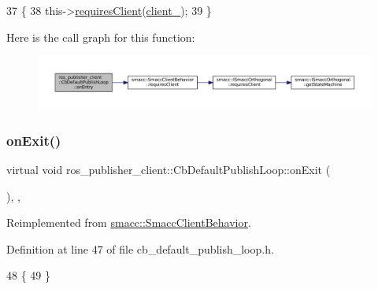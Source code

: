 \begin{DoxyCode}
37     \{
38         this->\hyperlink{classsmacc_1_1SmaccClientBehavior_a917f001e763a1059af337bf4e164f542}{requiresClient}(\hyperlink{classros__publisher__client_1_1CbDefaultPublishLoop_a90fc344876c742774a73542e338c3bfd}{client\_});
39     \}
\end{DoxyCode}
Here is the call graph for this function\+:
\nopagebreak
\begin{figure}[H]
\begin{center}
\leavevmode
\includegraphics[width=350pt]{classros__publisher__client_1_1CbDefaultPublishLoop_ada860aab5d8887e8671a6ae7f4b22e76_cgraph}
\end{center}
\end{figure}
\mbox{\label{classros__publisher__client_1_1CbDefaultPublishLoop_a47605e0cb9236077c9d9b0c42db9708c}} 
\subsubsection{\texorpdfstring{on\+Exit()}{onExit()}}
{\footnotesize\ttfamily virtual void ros\+\_\+publisher\+\_\+client\+::\+Cb\+Default\+Publish\+Loop\+::on\+Exit (\begin{DoxyParamCaption}{ }\end{DoxyParamCaption})\hspace{0.3cm}{\ttfamily [inline]}, {\ttfamily [override]}, {\ttfamily [virtual]}}



Reimplemented from \hyperlink{classsmacc_1_1SmaccClientBehavior_ac0cd72d42bd00425362a97c9803ecce5}{smacc\+::\+Smacc\+Client\+Behavior}.



Definition at line 47 of file cb\+\_\+default\+\_\+publish\+\_\+loop.\+h.


\begin{DoxyCode}
48     \{
49     \}
\end{DoxyCode}
\mbox{\label{classros__publisher__client_1_1CbDefaultPublishLoop_a8bba9039f6a6841c21e9bc89c2fd8ab7}} 
